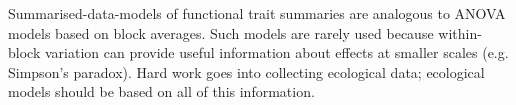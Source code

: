 \documentclass[12pt]{ecology}
\begin{document}


Summarised-data-models of functional trait summaries are analogous to ANOVA models based on block averages.  Such models are rarely used because within-block variation can provide useful information about effects at smaller scales (e.g. Simpson's paradox).  Hard work goes into collecting ecological data; ecological models should be based on all of this information.






\end{document}
